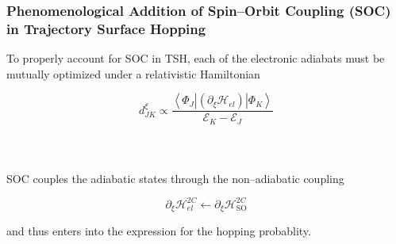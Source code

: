 \documentclass[usepdftitle=false,10pt]{beamer}
\newcommand{\innerop}[3]{\left\langle #1 \left\vert #2 \right\vert #3 \right\rangle}  %
\begin{document}
\begin{frame}
  \frametitle{Phenomenological Addition of Spin--Orbit Coupling (SOC) in
  Trajectory Surface Hopping}

  To properly account for SOC in TSH, each of the electronic adiabats must
  be mutually optimized under a relativistic Hamiltonian

  \begin{equation*}
    d_{JK}^\xi \propto \frac{\innerop{\Phi_J}{(\partial_\xi \mathcal{H}_{el})}{\Phi_K}}{\mathcal{E}_K - \mathcal{E}_J}
  \end{equation*}
  ~\\
  ~\\
  ~\\

  SOC couples the adiabatic states through the non--adiabatic coupling

  \begin{equation*}
    \partial_\xi \mathcal{H}^{2C}_{el} \leftarrow \partial_\xi \mathcal{H}^{2C}_\mathrm{SO}
  \end{equation*}

  and thus enters into the expression for the hopping probablity.
\end{frame}


%
%
%
%
%
\end{document}
